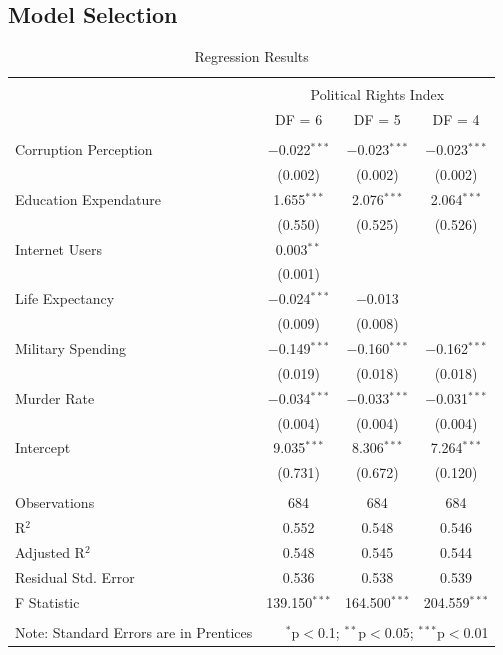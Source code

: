 \documentclass[
  english,
  man,floatsintext]{apa6}
\begin{document}
\hypertarget{model-selection}{%
\subsection{Model Selection}\label{model-selection}}

\begin{table}[!htbp] \centering 
  \caption{Regression Results} 
  \label{} 
\begin{tabular}{@{\extracolsep{5pt}}lccc} 
\\[-1.8ex]\hline 
\hline \\[-1.8ex] 
 & \multicolumn{3}{c}{Political Rights Index} \\ 
\cline{2-4} 
 & DF = 6 & DF = 5 & DF = 4 \\ 
\hline \\[-1.8ex] 
 Corruption Perception & $-$0.022$^{***}$ & $-$0.023$^{***}$ & $-$0.023$^{***}$ \\ 
  & (0.002) & (0.002) & (0.002) \\ 
  Education Expendature & 1.655$^{***}$ & 2.076$^{***}$ & 2.064$^{***}$ \\ 
  & (0.550) & (0.525) & (0.526) \\ 
  Internet Users & 0.003$^{**}$ &  &  \\ 
  & (0.001) &  &  \\ 
  Life Expectancy & $-$0.024$^{***}$ & $-$0.013 &  \\ 
  & (0.009) & (0.008) &  \\ 
  Military Spending & $-$0.149$^{***}$ & $-$0.160$^{***}$ & $-$0.162$^{***}$ \\ 
  & (0.019) & (0.018) & (0.018) \\ 
  Murder Rate & $-$0.034$^{***}$ & $-$0.033$^{***}$ & $-$0.031$^{***}$ \\ 
  & (0.004) & (0.004) & (0.004) \\ 
  Intercept & 9.035$^{***}$ & 8.306$^{***}$ & 7.264$^{***}$ \\ 
  & (0.731) & (0.672) & (0.120) \\ 
 \hline \\[-1.8ex] 
Observations & 684 & 684 & 684 \\ 
R$^{2}$ & 0.552 & 0.548 & 0.546 \\ 
Adjusted R$^{2}$ & 0.548 & 0.545 & 0.544 \\ 
Residual Std. Error & 0.536 & 0.538 & 0.539 \\ 
F Statistic & 139.150$^{***}$ & 164.500$^{***}$ & 204.559$^{***}$ \\ 
\hline 
\hline \\[-1.8ex] 
Note: Standard Errors are in Prentices & \multicolumn{3}{r}{$^{*}$p$<$0.1; $^{**}$p$<$0.05; $^{***}$p$<$0.01} \\ 
\end{tabular} 
\end{table}
\end{document}
